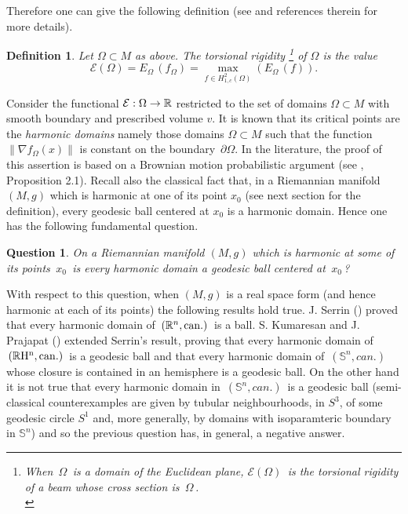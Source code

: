 \documentclass[11pt, reqno]{amsart}
\newtheorem{definition}[theoreme]{Definition}
\newtheorem{question}[theoreme]{Question}
\theoremstyle{plain}
\begin{document}
\vskip 0.3cm

Therefore one can give  the following  definition  (see \cite{MD} and references therein for more details).

\begin{definition}\label{fonctionnelle}
Let $\Omega\subset M$ as above. 
The {\em torsional rigidity}
 \footnote{When
$\,\Omega\,$ is a domain of the Euclidean plane, 
${\mathcal E} (\Omega) \,$ is the torsional rigidity of a beam whose cross section 
is $\,\Omega\,$.\\}  of $\Omega$ is the value
$${\mathcal E} (\Omega) = E_\Omega\, (f_\Omega) = \max_{f \in H_{1,c}^2 (\Omega)}
\left( E_\Omega\, (f)\right) .$$
\end{definition}

Consider  the functional ${\mathcal E}:\Omega\rightarrow {\Bbb{R}}$ restricted to the set of domains
$\Omega\subset M$ with smooth boundary and prescribed volume $v$. It is known that
its critical points are  the {\em harmonic domains} 
namely those domains $\Omega\subset M$ such that 
the function $\|\nabla f_\Omega (x)\|$
 is constant on the boundary $\,\partial \Omega$.
In the literature, the proof of this assertion is based on a Brownian motion probabilistic
argument (see \cite{MD}, Proposition 2.1).
Recall also   the classical fact  that,  in a 
Riemannian manifold $(M,g)$  which is harmonic at one of its point $x_0$  (see next section for the definition), 
every geodesic ball  centered at $x_0$ is  a harmonic domain. Hence one has  the following fundamental question.

\begin{question}\label{question2}
On  a Riemannian  manifold $(M, g)$ which is harmonic at some of its  points $\,x_0\,$
is every harmonic domain a geodesic ball centered at $\,x_0\,$?
\end{question}

With respect to this question, when $(M, g)$ is a real space form (and hence harmonic at each of its points) the following results hold true.
J. Serrin (\cite{Se}) proved that every harmonic domain 
of $\,(\mathbb R^n , {\rm can}.)\,$ is a ball. S. Kumaresan and J. Prajapat (\cite{K-P}) extended Serrin's result, proving that every harmonic domain
of $\,(\mathbb R \rm H^n, can.)\,$ is a geodesic ball and that every harmonic domain
of $\,(\mathbb S^n, can.)\,$ whose closure is contained in an hemisphere is a geodesic ball.
On the other hand  it is not true that every harmonic domain in $\,(\mathbb S^n, can.)\,$ is a geodesic ball
(semi-classical counterexamples are given by tubular neighbourhoods, in $S^3$, of some geodesic circle $S^1$ and, more generally, by domains with isoparamteric boundary in $\mathbb S^n$) and so the previous question has, in general, a negative answer.
\end{document}
